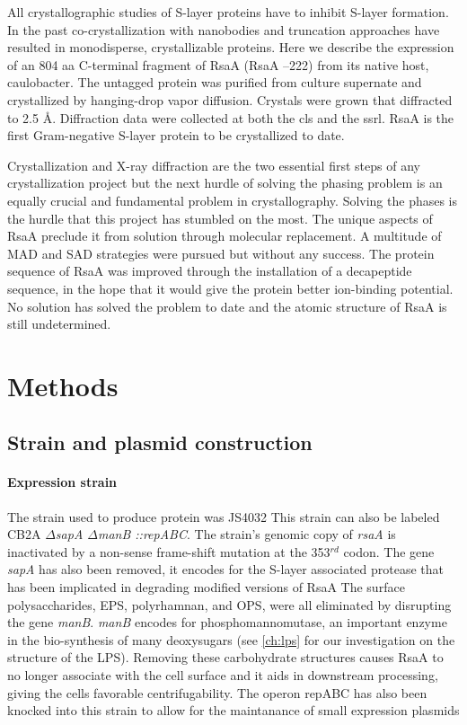 All crystallographic studies of \ac{S-layer} proteins have to inhibit \ac{S-layer} formation. In the
past co-crystallization with nanobodies
 and truncation
 approaches have resulted in monodisperse, crystallizable proteins. Here we describe the
expression of an 804 \ac{aa} C-terminal fragment of RsaA (RsaA --222) from
its native host, \ac{caulobacter}. The untagged protein was purified
from culture supernate and crystallized by hanging-drop vapor
diffusion. Crystals were grown that diffracted to 2.5 \AA.
Diffraction data were collected at both the \ac{cls} 
and the \ac{ssrl}. RsaA is the first Gram-negative \ac{S-layer} protein to be
crystallized to date.

Crystallization and X-ray diffraction are the two essential first steps of any crystallization project but the next hurdle of solving the phasing problem is an equally crucial and fundamental problem in crystallography. Solving the phases is the hurdle that this project has stumbled on the most. The unique aspects of RsaA preclude it from solution through molecular replacement. A multitude of \ac{MAD} and \ac{SAD} strategies were pursued but without any success. The protein sequence of RsaA was improved through the installation of a decapeptide sequence, in the hope that it would give the protein better ion-binding potential. No solution has solved the problem to date and the atomic structure of RsaA is still undetermined.

\section{Methods}
\label{sec:crystal-materials-and-methods}

\subsection{Strain and plasmid construction}\label{sec:stra-plasm-constr}

\paragraph{Expression strain} The strain used to produce protein was JS4032 
This strain can also be labeled \caulobacter{} CB2A \textit{$\Delta$sapA $\Delta$manB ::repABC}. The strain's genomic copy of \textit{rsaA} is inactivated by a non-sense frame-shift mutation at the 353$^{rd}$ codon. The gene \textit{sapA} has also been removed, it encodes for the S-layer associated protease that has been implicated in degrading modified versions of RsaA The surface polysaccharides, \ac{EPS}, polyrhamnan, and \ac{OPS}, were all eliminated by disrupting the gene \textit{manB}. \textit{manB} encodes for phosphomannomutase, an important enzyme in the bio-synthesis of many deoxysugars (see \cref{ch:lps} for our investigation on the structure of the \ac{LPS}). Removing these carbohydrate structures causes RsaA to no longer associate with the cell surface and it aids in downstream processing, giving the cells favorable centrifugability. The operon repABC has also been knocked into this strain to allow for the maintanance of small expression plasmids

